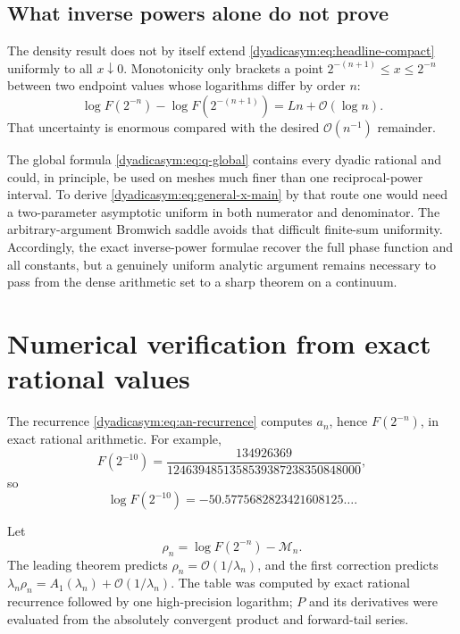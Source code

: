 \documentclass[11pt,oneside]{article}
\theoremstyle{definition}
\theoremstyle{remark}
\newcommand{\bigO}{\mathcal O}
\begin{document}
\subsection{What inverse powers alone do not prove}

The density result does not by itself extend \eqref{dyadicasym:eq:headline-compact} uniformly to all
$x\downarrow0$.  Monotonicity only brackets a point
$2^{-(n+1)}\le x\le2^{-n}$ between two endpoint values whose logarithms differ by order $n$:
\begin{equation}
 \log F(2^{-n})-\log F(2^{-(n+1)})=Ln+\bigO(\log n).        \label{dyadicasym:eq:dyadic-gap}
\end{equation}
That uncertainty is enormous compared with the desired $\bigO(n^{-1})$ remainder.

The global formula \eqref{dyadicasym:eq:q-global} contains every dyadic rational and could, in principle,
be used on meshes much finer than one reciprocal-power interval.  To derive
\eqref{dyadicasym:eq:general-x-main} by that route one would need a two-parameter asymptotic uniform in
both numerator and denominator.  The arbitrary-argument Bromwich saddle avoids that difficult
finite-sum uniformity.  Accordingly, the exact inverse-power formulae recover the full phase
function and all constants, but a genuinely uniform analytic argument remains necessary to
pass from the dense arithmetic set to a sharp theorem on a continuum.

\section{Numerical verification from exact rational values}
\label{dyadicasym:sec:numerics}

The recurrence \eqref{dyadicasym:eq:an-recurrence} computes $a_n$, hence $F(2^{-n})$, in exact rational
arithmetic.  For example,
\begin{equation}
 F(2^{-10})=
 \frac{134926369}{1246394851358539387238350848000},         \label{dyadicasym:eq:F10}
\end{equation}
so
\begin{equation*}
 \log F(2^{-10})=-50.5775682823421608125\ldots.
\end{equation*}

Let
\begin{equation}
 \rho_n=\log F(2^{-n})-\mathcal M_n.                        \label{dyadicasym:eq:rho}
\end{equation}
The leading theorem predicts $\rho_n=\bigO(1/\lambda_n)$, and the first correction predicts
$\lambda_n\rho_n=A_1(\lambda_n)+\bigO(1/\lambda_n)$.  The table was computed by exact rational
recurrence followed by one high-precision logarithm; $P$ and its derivatives were evaluated
from the absolutely convergent product and forward-tail series.
\end{document}
